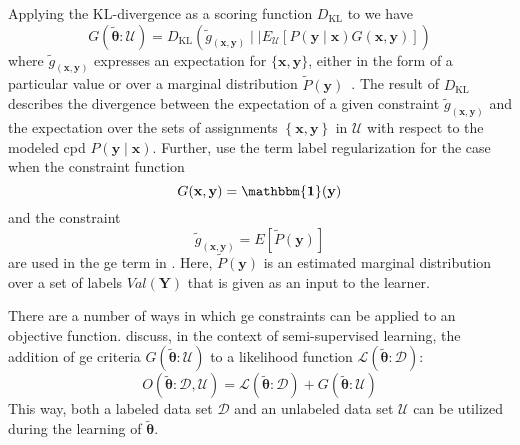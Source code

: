 Applying the $\text{KL}$-divergence as a scoring function $D_{\text{KL}}$ to  we have~\citep{mann2010generalized}
\begin{equation}
  \label{equ:generalized-expectation-kl}
  G(\bm{\tilde{\theta}}:\mathcal{U})=D_{\text{KL}}\left(\tilde{g}_{\left(\mathbf{x},\mathbf{y}\right)}\mid\mid E_{\mathcal{U}}\left[P(\mathbf{y}\mid\mathbf{x})G(\mathbf{x},\mathbf{y})\right]\right)
\end{equation}
where $\tilde{g}_{\left(\mathbf{x},\mathbf{y}\right)}$ expresses an expectation for $\{\mathbf{x},\mathbf{y}\}$, either in the form of a particular value or over a \gls{marginal distribution} $\tilde{P}\left(\mathbf{y}\right)$~\citep{mann2010generalized}.
The result of $D_{\text{KL}}$ describes the divergence between the expectation of a given constraint $\tilde{g}_{\left(\mathbf{x},\mathbf{y}\right)}$ and the expectation over the sets of assignments $\left\{\mathbf{x},\mathbf{y}\right\}$ in $\mathcal{U}$ with respect to the modeled \gls{cpd} $P(\mathbf{y}\mid\mathbf{x})$.
Further, \citet{mann2010generalized} use the term \gls{label regularization} for the case when the constraint function
\begin{equation}
  \label{equ:label-regularization-constraint-function}
  G(\mathbf{x},\mathbf{y})=\mathbf{\mathbbm{1}}(\mathbf{y})
\end{equation}
and the constraint
\begin{equation}
  \label{equ:label-regularization-constraints}
  \tilde{g}_{\left(\mathbf{x},\mathbf{y}\right)}=E[\tilde{P}(\mathbf{y})]
\end{equation}
are used in the \gls{ge} term in .
Here, $\tilde{P}(\mathbf{y})$ is an estimated \gls{marginal distribution} over a set of labels $Val(\mathbf{Y})$ that is given as an input to the learner.

\bigskip

There are a number of ways in which \gls{ge} constraints can be applied to an \gls{objective function}.
\citet{mann2010generalized} discuss, in the context of semi-supervised learning, the addition of \gls{ge} criteria $G(\bm{\tilde{\theta}}:\mathcal{U})$ to a likelihood function $\mathcal{L}(\bm{\tilde{\theta}}:\mathcal{D})$:
\begin{equation}
  \label{equ:objective-function-l-g}
  O(\bm{\tilde{\theta}}:\mathcal{D},\mathcal{U})=\mathcal{L}(\bm{\tilde{\theta}}:\mathcal{D})+G(\bm{\tilde{\theta}}:\mathcal{U})
\end{equation}
This way, both a labeled data set $\mathcal{D}$ and an unlabeled data set $\mathcal{U}$ can be utilized during the learning of $\bm{\tilde{\theta}}$.

